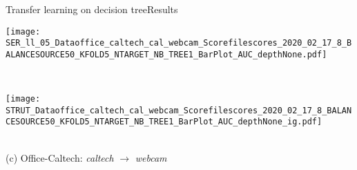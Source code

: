 \begin{frame}{Transfer learning on decision tree}{Results}
\begin{minipage}[t]{0.33\linewidth}
        \end{minipage}\hfill
        \begin{minipage}[t]{0.329\linewidth}\vspace{0pt}
            \centering
            \begin{minipage}[t]{\ratio\linewidth}\vspace{0pt}
            \centerline{\texttt{[image: SER\_ll\_05\_Dataoffice\_caltech\_cal\_webcam\_Scorefilescores\_2020\_02\_17\_8\_BALANCESOURCE50\_KFOLD5\_NTARGET\_NB\_TREE1\_BarPlot\_AUC\_depthNone.pdf]}}
            \end{minipage}\\
            \begin{minipage}[t]{\ratio\linewidth}\vspace{0cm}
            \centerline{\texttt{[image: STRUT\_Dataoffice\_caltech\_cal\_webcam\_Scorefilescores\_2020\_02\_17\_8\_BALANCESOURCE50\_KFOLD5\_NTARGET\_NB\_TREE1\_BarPlot\_AUC\_depthNone\_ig.pdf]}}
            \end{minipage}\\
            \medskip
            {\small(c)\; Office-Caltech: \emph{caltech} $\rightarrow$ \emph{webcam}}
        \end{minipage}
    
\end{frame}

